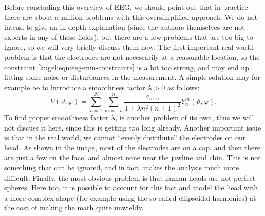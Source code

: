 Before concluding this overview of EEG, we should point out that in practice
there are about a million problems with this oversimplified approach. We do not
intend to give an in depth explanation (since the authors themselves are not
experts in any of these fields), but there are a few problems that are too big
to ignore, so we will very briefly discuss them now. The first important
real-world problem is that the electrodes are not necessarily at a reasonable
location, so the constraint \eqref{kugel:eqn:eeg-min-constraints} is a bit too
strong, and may end up fitting some noise or disturbances in the measurement. A
simple solution may for example be to introduce a smoothness factor $\lambda >
0$ as follows:
\begin{equation}
  V(\vartheta, \varphi) = \sum_{n=1}^N \sum_{m=-n}^n 
    \frac{a_{m,n}}{1 + \lambda n^2(n+1)^2} Y^m_n(\vartheta, \varphi).
\end{equation}
To find proper smoothness factor $\lambda$, is another problem of its own, thus
we will not discuss it here, since this is getting too long already. Another
important issue is that in the real world, we cannot ``evenly distribute'' the
electrodes on our head. As shown in the image, most of the electrodes are on a
cap, and then there are just a few on the face, and almost none near the jawline
and chin. This is not something that can be ignored, and in fact, makes the
analysis much more difficult. Finally, the most obvious problem is that human
heads are not perfect spheres. Here too, it is possible to account for this fact
and model the head with a more complex shape (for example using the so called
ellipsoidal harmonics) at the cost of making the math quite unwieldy.


